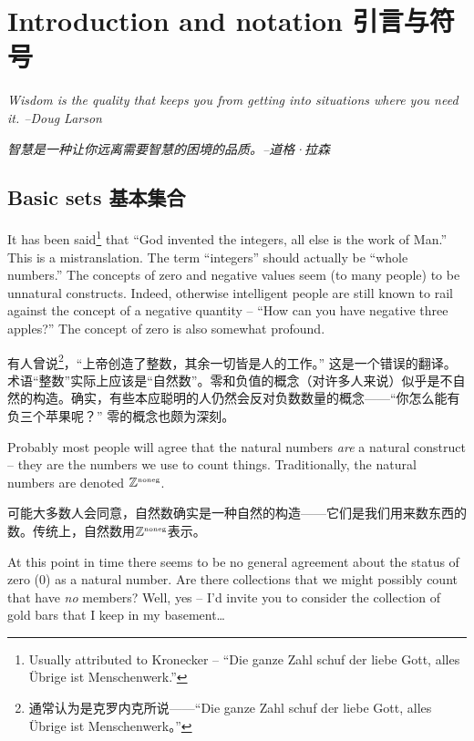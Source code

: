 \chapter{Introduction and notation \quad \quad 引言与符号}
\label{ch:intro}

{\em Wisdom is the quality that keeps you from getting into situations where you need it. --Doug Larson}

{\em 智慧是一种让你远离需要智慧的困境的品质。--道格·拉森}

\section{Basic sets 基本集合}
\label{sec:basic}

It has been said\footnote{Usually attributed to 
Kronecker -- ``Die ganze Zahl schuf der liebe Gott, alles \"{U}brige 
ist Menschenwerk.''} that ``God invented
the integers, all else is the work of Man.''  This is 
a mistranslation.  The term ``integers'' should
actually be ``whole numbers.''  The concepts of zero and negative 
values seem (to many people) to be unnatural constructs.  Indeed, otherwise
intelligent people are still known to rail against the concept of a
negative quantity -- ``How can you have negative three apples?'' 
The concept of zero is also somewhat profound.

有人曾说\footnote{通常认为是克罗内克所说——“Die ganze Zahl schuf der liebe Gott, alles \"{U}brige ist Menschenwerk。”}，“上帝创造了整数，其余一切皆是人的工作。” 这是一个错误的翻译。术语“整数”实际上应该是“自然数”。零和负值的概念（对许多人来说）似乎是不自然的构造。确实，有些本应聪明的人仍然会反对负数数量的概念——“你怎么能有负三个苹果呢？” 零的概念也颇为深刻。

Probably most people will agree that the 
 natural numbers {\em are} a natural construct -- they are the numbers we use to count things.  Traditionally, the natural numbers are denoted ${\mathbb Z}^{\mbox{\tiny noneg}}$.

可能大多数人会同意，自然数确实是一种自然的构造——它们是我们用来数东西的数。传统上，自然数用${\mathbb Z}^{\mbox{\tiny noneg}}$表示。

At this point in time there seems to be no general agreement about the status
of zero ($0$) as a natural number. Are there collections that we might possibly
count that have \emph{no} members? Well, yes -- I'd invite you to consider the collection of gold bars that I keep in my basement\ldots

